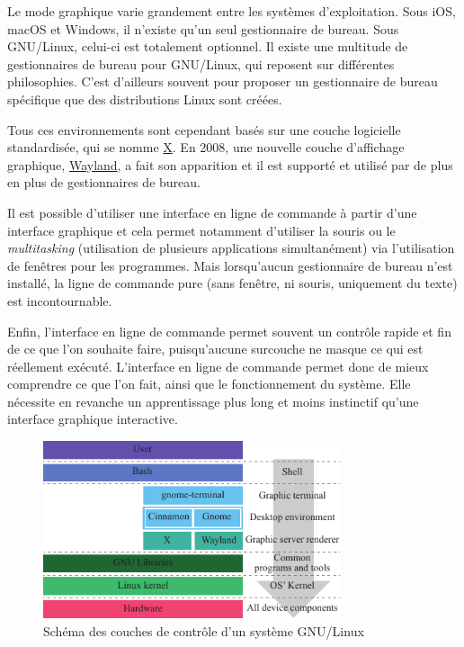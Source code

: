 Le mode graphique varie grandement entre les systèmes d'exploitation. Sous iOS, macOS et Windows, il n'existe qu'un seul gestionnaire de bureau. Sous GNU/Linux, celui-ci est totalement optionnel. Il existe une multitude de gestionnaires de bureau pour GNU/Linux, qui reposent sur différentes philosophies. C'est d'ailleurs souvent pour proposer un gestionnaire de bureau spécifique que des distributions Linux sont créées.

Tous ces environnements sont cependant basés sur une couche logicielle standardisée, qui se nomme \href{https://www.x.org}{X}. En 2008, une nouvelle couche d'affichage graphique, \href{https://wayland.freedesktop.org}{Wayland}, a fait son apparition et il est supporté et utilisé par de plus en plus de gestionnaires de bureau.

Il est possible d'utiliser une interface en ligne de commande à partir d'une interface graphique et cela permet notamment d'utiliser la souris ou le \textit{multitasking} (utilisation de plusieurs applications simultanément) via l'utilisation de fenêtres pour les programmes. Mais lorsqu'aucun gestionnaire de bureau n'est installé, la ligne de commande pure (sans fenêtre, ni souris, uniquement du texte) est incontournable.

Enfin, l'interface en ligne de commande permet souvent un contrôle rapide et fin de ce que l'on souhaite faire, puisqu'aucune surcouche ne masque ce qui est réellement exécuté. L'interface en ligne de commande permet donc de mieux comprendre ce que l'on fait, ainsi que le fonctionnement du système. Elle nécessite en revanche un apprentissage plus long et moins instinctif qu'une interface graphique interactive.

\begin{figure}[hb!]
\includegraphics[width=0.78\textwidth]{res/linux_control_interface.pdf}
\centering
\caption{Schéma des couches de contrôle d'un système GNU/Linux}
\label{fig:interface}
\end{figure} \vspace{-2mm}

